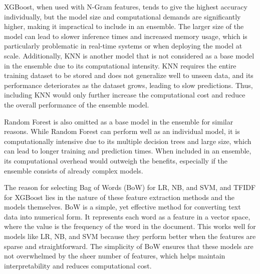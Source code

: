 \vspace{1em}

\noindent
XGBoost, when used with N-Gram features, tends to give the highest accuracy individually, but the model size and computational demands are significantly higher, making it impractical to include in an ensemble. The larger size of the model can lead to slower inference times and increased memory usage, which is particularly problematic in real-time systems or when deploying the model at scale. Additionally, KNN is another model that is not considered as a base model in the ensemble due to its computational intensity. KNN requires the entire training dataset to be stored and does not generalize well to unseen data, and its performance deteriorates as the dataset grows, leading to slow predictions. Thus, including KNN would only further increase the computational cost and reduce the overall performance of the ensemble model.

\vspace{1em}

\noindent
Random Forest is also omitted as a base model in the ensemble for similar reasons. While Random Forest can perform well as an individual model, it is computationally intensive due to its multiple decision trees and large size, which can lead to longer training and prediction times. When included in an ensemble, its computational overhead would outweigh the benefits, especially if the ensemble consists of already complex models.

\vspace{1em}

\noindent
The reason for selecting Bag of Words (BoW) for LR, NB, and SVM, and TFIDF for XGBoost lies in the nature of these feature extraction methods and the models themselves. BoW is a simple, yet effective method for converting text data into numerical form. It represents each word as a feature in a vector space, where the value is the frequency of the word in the document. This works well for models like LR, NB, and SVM because they perform better when the features are sparse and straightforward. The simplicity of BoW ensures that these models are not overwhelmed by the sheer number of features, which helps maintain interpretability and reduces computational cost.

\vspace{1em}

